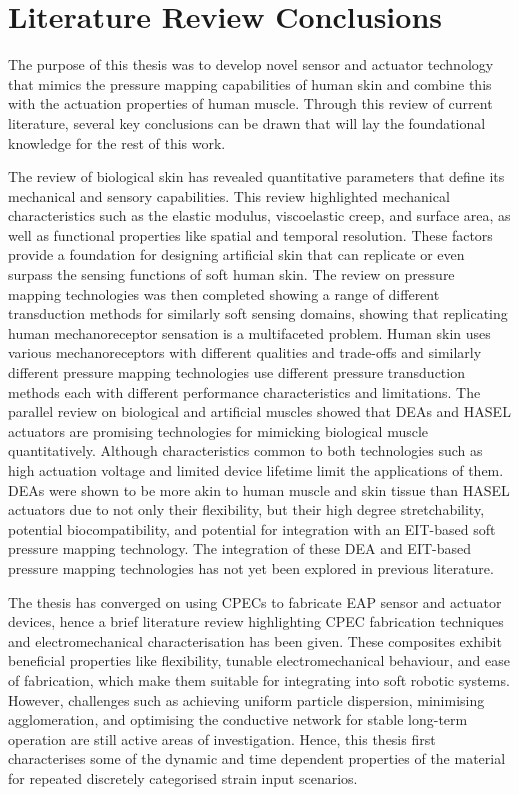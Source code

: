 \newpage
\section{Literature Review Conclusions}
The purpose of this thesis was to develop novel sensor and actuator technology that mimics the pressure mapping capabilities of human skin and combine this with the actuation properties of human muscle. Through this review of current literature, several key conclusions can be drawn that will lay the foundational knowledge for the rest of this work.

The review of biological skin has revealed quantitative parameters that define its mechanical and sensory capabilities. This review highlighted mechanical characteristics such as the elastic modulus, viscoelastic creep, and surface area, as well as functional properties like spatial and temporal resolution. These factors provide a foundation for designing artificial skin that can replicate or even surpass the sensing functions of soft human skin. The review on pressure mapping technologies was then completed showing a range of different transduction methods for similarly soft sensing domains, showing that replicating human mechanoreceptor sensation is a multifaceted problem. Human skin uses various mechanoreceptors with different qualities and trade-offs and similarly different pressure mapping technologies use different pressure transduction methods each with different performance characteristics and limitations. The parallel review on biological and artificial muscles showed that DEAs and HASEL actuators are promising technologies for mimicking biological muscle quantitatively. Although characteristics common to both technologies such as high actuation voltage and limited device lifetime limit the applications of them. DEAs were shown to be more akin to human muscle and skin tissue than HASEL actuators due to not only their flexibility, but their high degree stretchability, potential biocompatibility, and potential for integration with an EIT-based soft pressure mapping technology. The integration of these DEA and EIT-based pressure mapping technologies  has not yet been explored in previous literature.

The thesis has converged on using CPECs to fabricate EAP sensor and actuator devices, hence a brief literature review highlighting CPEC fabrication techniques and electromechanical characterisation has been given. These composites exhibit beneficial properties like flexibility, tunable electromechanical behaviour, and ease of fabrication, which make them suitable for integrating into soft robotic systems. However, challenges such as achieving uniform particle dispersion, minimising agglomeration, and optimising the conductive network for stable long-term operation are still active areas of investigation. Hence, this thesis first characterises some of the dynamic and time dependent properties of the material for repeated discretely categorised strain input scenarios.

